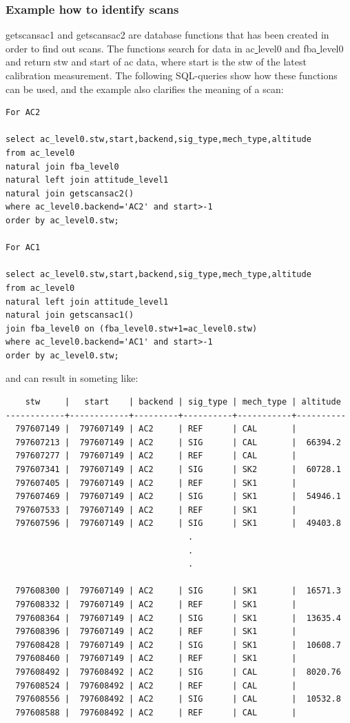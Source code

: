 \documentclass[12pt]{article}
\begin{document}
\subsubsection*{Example how to identify scans}
getscansac1 and getscansac2 are database functions that has been 
created in order to find out scans.
The functions search for data in ac\underline{ }level0
and fba\underline{ }level0 and return stw and start of ac data, 
where start is the stw of the latest calibration measurement. 
The following SQL-queries show how these functions can be used,
and the example also clarifies the meaning of a scan: 
\begin{verbatim}
For AC2

select ac_level0.stw,start,backend,sig_type,mech_type,altitude 
from ac_level0 
natural join fba_level0
natural left join attitude_level1
natural join getscansac2() 
where ac_level0.backend='AC2' and start>-1
order by ac_level0.stw;

For AC1

select ac_level0.stw,start,backend,sig_type,mech_type,altitude 
from ac_level0 
natural left join attitude_level1
natural join getscansac1() 
join fba_level0 on (fba_level0.stw+1=ac_level0.stw)
where ac_level0.backend='AC1' and start>-1
order by ac_level0.stw;
\end{verbatim}
and can result in someting like:
\begin{verbatim}
    stw     |   start    | backend | sig_type | mech_type | altitude 
------------+------------+---------+----------+-----------+----------
  797607149 |  797607149 | AC2     | REF      | CAL       |         
  797607213 |  797607149 | AC2     | SIG      | CAL       |  66394.2
  797607277 |  797607149 | AC2     | REF      | CAL       |         
  797607341 |  797607149 | AC2     | SIG      | SK2       |  60728.1
  797607405 |  797607149 | AC2     | REF      | SK1       |         
  797607469 |  797607149 | AC2     | SIG      | SK1       |  54946.1
  797607533 |  797607149 | AC2     | REF      | SK1       |         
  797607596 |  797607149 | AC2     | SIG      | SK1       |  49403.8
                                     .
                                     .
                                     .

  797608300 |  797607149 | AC2     | SIG      | SK1       |  16571.3
  797608332 |  797607149 | AC2     | REF      | SK1       |         
  797608364 |  797607149 | AC2     | SIG      | SK1       |  13635.4
  797608396 |  797607149 | AC2     | REF      | SK1       |         
  797608428 |  797607149 | AC2     | SIG      | SK1       |  10608.7
  797608460 |  797607149 | AC2     | REF      | SK1       |         
  797608492 |  797608492 | AC2     | SIG      | CAL       |  8020.76
  797608524 |  797608492 | AC2     | REF      | CAL       |         
  797608556 |  797608492 | AC2     | SIG      | CAL       |  10532.8
  797608588 |  797608492 | AC2     | REF      | CAL       |         
\end{verbatim}
\end{document}
